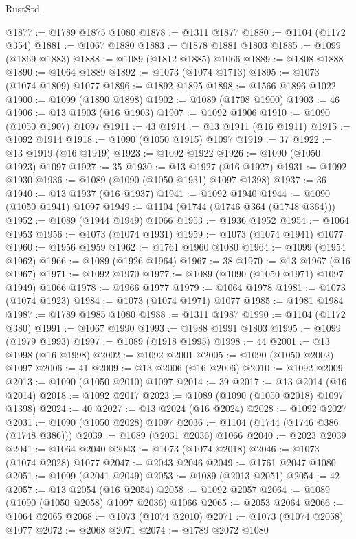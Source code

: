 \begin{lexlean}{RustStd}
\begin{coremodule}
@1877 := @1789 @1875 @1080
@1878 := @1311 @1877
@1880 := @1104 (@1172 @354)
@1881 := @1067 @1880
@1883 := @1878 @1881 @1803
@1885 := @1099 (@1869 @1883)
@1888 := @1089 (@1812 @1885) @1066
@1889 := @1808 @1888
@1890 := @1064 @1889
@1892 := @1073 (@1074 @1713)
@1895 := @1073 (@1074 @1809) @1077
@1896 := @1892 @1895
@1898 := @1566 @1896 @1022
@1900 := @1099 (@1890 @1898)
@1902 := @1089 (@1708 @1900)
@1903 := 46
@1906 := @13 @1903 (@16 @1903)
@1907 := @1092 @1906
@1910 := @1090 (@1050 @1907) @1097
@1911 := 43
@1914 := @13 @1911 (@16 @1911)
@1915 := @1092 @1914
@1918 := @1090 (@1050 @1915) @1097
@1919 := 37
@1922 := @13 @1919 (@16 @1919)
@1923 := @1092 @1922
@1926 := @1090 (@1050 @1923) @1097
@1927 := 35
@1930 := @13 @1927 (@16 @1927)
@1931 := @1092 @1930
@1936 := @1089 (@1090 (@1050 @1931) @1097 @1398)
@1937 := 36
@1940 := @13 @1937 (@16 @1937)
@1941 := @1092 @1940
@1944 := @1090 (@1050 @1941) @1097
@1949 := @1104 (@1744 (@1746 @364 (@1748 @364)))
@1952 := @1089 (@1944 @1949) @1066
@1953 := @1936 @1952
@1954 := @1064 @1953
@1956 := @1073 (@1074 @1931)
@1959 := @1073 (@1074 @1941) @1077
@1960 := @1956 @1959
@1962 := @1761 @1960 @1080
@1964 := @1099 (@1954 @1962)
@1966 := @1089 (@1926 @1964)
@1967 := 38
@1970 := @13 @1967 (@16 @1967)
@1971 := @1092 @1970
@1977 := @1089 (@1090 (@1050 @1971) @1097 @1949) @1066
@1978 := @1966 @1977
@1979 := @1064 @1978
@1981 := @1073 (@1074 @1923)
@1984 := @1073 (@1074 @1971) @1077
@1985 := @1981 @1984
@1987 := @1789 @1985 @1080
@1988 := @1311 @1987
@1990 := @1104 (@1172 @380)
@1991 := @1067 @1990
@1993 := @1988 @1991 @1803
@1995 := @1099 (@1979 @1993)
@1997 := @1089 (@1918 @1995)
@1998 := 44
@2001 := @13 @1998 (@16 @1998)
@2002 := @1092 @2001
@2005 := @1090 (@1050 @2002) @1097
@2006 := 41
@2009 := @13 @2006 (@16 @2006)
@2010 := @1092 @2009
@2013 := @1090 (@1050 @2010) @1097
@2014 := 39
@2017 := @13 @2014 (@16 @2014)
@2018 := @1092 @2017
@2023 := @1089 (@1090 (@1050 @2018) @1097 @1398)
@2024 := 40
@2027 := @13 @2024 (@16 @2024)
@2028 := @1092 @2027
@2031 := @1090 (@1050 @2028) @1097
@2036 := @1104 (@1744 (@1746 @386 (@1748 @386)))
@2039 := @1089 (@2031 @2036) @1066
@2040 := @2023 @2039
@2041 := @1064 @2040
@2043 := @1073 (@1074 @2018)
@2046 := @1073 (@1074 @2028) @1077
@2047 := @2043 @2046
@2049 := @1761 @2047 @1080
@2051 := @1099 (@2041 @2049)
@2053 := @1089 (@2013 @2051)
@2054 := 42
@2057 := @13 @2054 (@16 @2054)
@2058 := @1092 @2057
@2064 := @1089 (@1090 (@1050 @2058) @1097 @2036) @1066
@2065 := @2053 @2064
@2066 := @1064 @2065
@2068 := @1073 (@1074 @2010)
@2071 := @1073 (@1074 @2058) @1077
@2072 := @2068 @2071
@2074 := @1789 @2072 @1080

\end{coremodule}
\end{lexlean}
